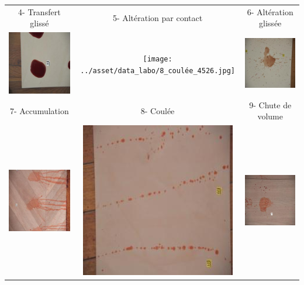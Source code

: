 \documentclass[a4paper]{article}
\begin{document}
\begin{table}[H]
\begin{tabular}{ccc}
        4- Transfert glissé & 5- Altération par contact & 6- Altération glissée \\
        \includegraphics[width=0.25\linewidth]{../asset/data_labo/7_carrelage_5507.jpg} & \texttt{[image: ../asset/data\_labo/8\_coulée\_4526.jpg]} & \includegraphics[width=0.25\linewidth]{../asset/data_labo/9_papier_6375.jpg} \\
        7- Accumulation & 8- Coulée & 9- Chute de volume \\
        \includegraphics[width=0.25\linewidth]{../asset/data_labo/10_lino_933.jpg} & \includegraphics[width=0.25\linewidth]{../asset/data_labo/11_carrelage_905.jpg} & \includegraphics[width=0.25\linewidth]{../asset/data_labo/12_bois_326.jpg} \\

\end{tabular}
\end{table}
\end{document}

